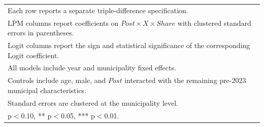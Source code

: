 \begin{table}[!htbp]
\begin{tabular}{llccccr}
\multicolumn{7}{l}{\footnotesize Each row reports a separate triple-difference specification.} \\
\multicolumn{7}{l}{\footnotesize LPM columns report coefficients on $Post \times X \times Share$ with clustered standard errors in parentheses.} \\
\multicolumn{7}{l}{\footnotesize Logit columns report the sign and statistical significance of the corresponding Logit coefficient.} \\
\multicolumn{7}{l}{\footnotesize All models include year and municipality fixed effects.} \\
\multicolumn{7}{l}{\footnotesize Controls include age, male, and $Post$ interacted with the remaining pre-2023 municipal characteristics.} \\
\multicolumn{7}{l}{\footnotesize Standard errors are clustered at the municipality level.} \\
\multicolumn{7}{l}{\footnotesize * p$<$0.10, ** p$<$0.05, *** p$<$0.01.} \\
\end{tabular}
\end{table}
